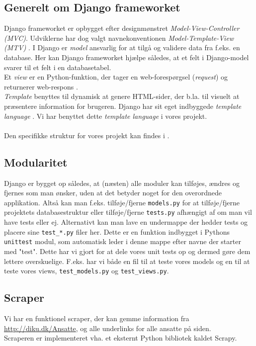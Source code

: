 \documentclass[12pt]{article}
\begin{document}
\subsection{Generelt om Django frameworket}
Django frameworket er opbygget efter designmønstret \textit{Model-View-Controller (MVC)}. Udviklerne har dog valgt navnekonventionen \textit{Model-Template-View (MTV)} \cite{djangoFAQ}. I Django er \textit{model} ansvarlig for at tilgå og validere data fra f.eks. en database. Her kan Django frameworket hjælpe således, at et felt i Django-model svarer til et felt i en databasetabel. \\
Et \textit{view} er en Python-funktion, der tager en web-forespørgsel (\textit{request}) og returnerer web-respons \cite{djangoView}. \\
\textit{Template} benyttes til dynamisk at genere HTML-sider, der b.la. til visuelt at præsentere information for brugeren. Django har sit eget indbyggede \textit{template language} \cite{djangoTemplate}. Vi har benyttet dette \textit{template language} i vores projekt.\\
\\
Den specifikke struktur for vores projekt kan findes i .

\subsection{Modularitet}
Django er bygget op således, at (næsten) alle moduler kan tilføjes, ændres og fjernes som man ønsker, uden at det betyder noget for den overordnede applikation. Altså kan man f.eks. tilføje/fjerne \texttt{models.py} for at tilføje/fjerne projektets databasestruktur eller tilføje/fjerne \texttt{tests.py} afhængigt af om man vil have tests eller ej. Alternativt kan man lave en undermappe der hedder tests og placere sine \texttt{test\_*.py} filer her. Dette er en funktion indbygget i Pythons \texttt{unittest} modul, som automatisk leder i denne mappe efter navne der starter med "test".
Dette har vi gjort for at dele vores unit tests op og dermed gøre dem lettere overskuelige. F.eks. har vi både en fil til at teste vores models og en til at teste vores views, \texttt{test\_models.py} og \texttt{test\_views.py}.

\subsection{Scraper}
Vi har en funktionel scraper, der kan gemme information fra \url{http://diku.dk/Ansatte}, og alle underlinks for alle ansatte på siden.\\
Scraperen er implementeret vha. et eksternt Python bibliotek kaldet Scrapy.
\end{document}
